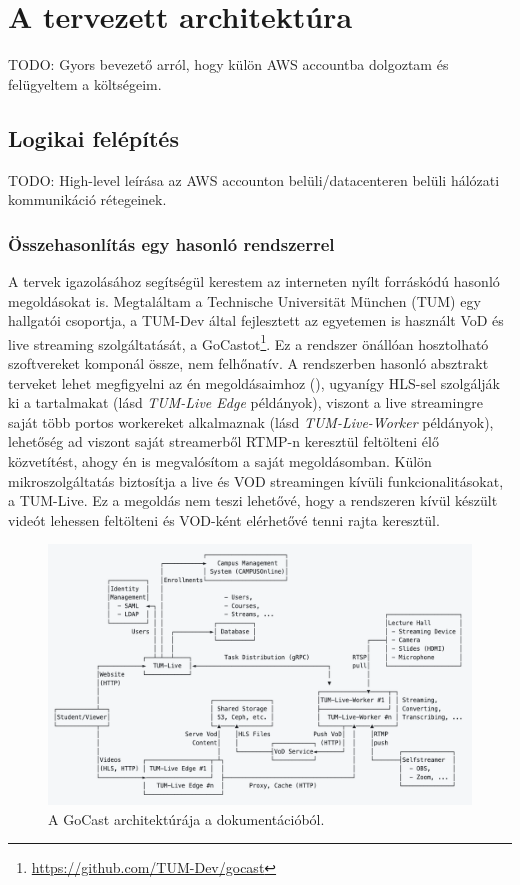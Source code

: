 \chapter{A tervezett architektúra}

TODO: Gyors bevezető arról, hogy külön AWS accountba dolgoztam és felügyeltem a költségeim.

\section{Logikai felépítés}

TODO: High-level leírása az AWS accounton belüli/datacenteren belüli hálózati kommunikáció rétegeinek.

\subsection{Összehasonlítás egy hasonló rendszerrel}

A tervek igazolásához segítségül kerestem az interneten nyílt forráskódú hasonló megoldásokat is. Megtaláltam a Technische Universität München (TUM) egy hallgatói csoportja, a TUM-Dev által fejlesztett az egyetemen is használt VoD és live streaming szolgáltatását, a GoCastot\footnote{\url{https://github.com/TUM-Dev/gocast}}. Ez a rendszer önállóan hosztolható szoftvereket komponál össze, nem felhőnatív. A rendszerben hasonló absztrakt terveket lehet megfigyelni az én megoldásaimhoz (), ugyanígy HLS-sel szolgálják ki a tartalmakat (lásd \emph{TUM-Live Edge} példányok), viszont a live streamingre saját több portos workereket alkalmaznak (lásd \emph{TUM-Live-Worker} példányok), lehetőség ad viszont saját streamerből RTMP-n keresztül feltölteni élő közvetítést, ahogy én is megvalósítom a saját megoldásomban. Külön mikroszolgáltatás biztosítja a live és VOD streamingen kívüli funkcionalitásokat, a TUM-Live. Ez a megoldás nem teszi lehetővé, hogy a rendszeren kívül készült videót lehessen feltölteni és VOD-ként elérhetővé tenni rajta keresztül.

\begin{figure}[ht]
	\centering
	\includegraphics[width=140mm, keepaspectratio]{figures/gocast.png}
	\caption{A GoCast architektúrája a dokumentációból.}
	\label{fig:gocast}
\end{figure}

